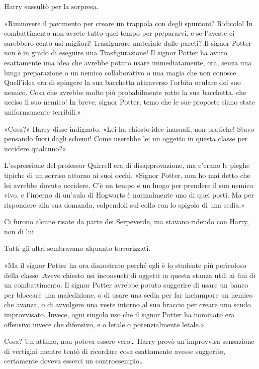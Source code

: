 Harry sussultò per la sorpresa.

«Rimuovere il pavimento per creare un trappola con degli spuntoni? Ridicolo! In combattimento non avrete tutto quel tempo per prepararvi, e se l’aveste ci sarebbero cento usi migliori! Trasfigurare materiale dalle pareti? Il signor Potter non è in grado di eseguire una Trasfigurazione! Il signor Potter ha avuto esattamente una idea che avrebbe potuto usare immediatamente, ora, senza una lunga preparazione o un nemico collaborativo o una magia che non conosce. Quell’idea era di spingere la sua bacchetta attraverso l’orbita oculare del suo nemico. Cosa che avrebbe molto più probabilmente rotto la sua bacchetta, che ucciso il suo nemico! In breve, signor Potter, temo che le sue proposte siano state uniformemente terribili.»

«Cosa?» Harry disse indignato. «Lei ha chiesto idee inusuali, non pratiche! Stavo pensando fuori dagli schemi! Come userebbe lei un oggetto in questa classe per uccidere qualcuno?»

L’espressione del professor Quirrell era di disapprovazione, ma c’erano le pieghe tipiche di un sorriso attorno ai suoi occhi. «Signor Potter, non ho mai detto che lei avrebbe dovuto uccidere. C’è un tempo e un luogo per prendere il suo nemico vivo, e l’interno di un’aula di Hogwarts è normalmente uno di quei posti. Ma per rispondere alla sua domanda, colpendoli sul collo con lo spigolo di una sedia.»

Ci furono alcune risate da parte dei Serpeverde, ma stavano ridendo con Harry, non di lui.

Tutti gli altri sembravano alquanto terrorizzati.

«Ma il signor Potter ha ora dimostrato perché egli è lo studente più pericoloso della classe. Avevo chiesto usi inconsueti di oggetti in questa stanza utili ai fini di un combattimento. Il signor Potter avrebbe potuto suggerire di usare un banco per bloccare una maledizione, o di usare una sedia per far inciampare un nemico che avanza, o di avvolgere una veste intorno al suo braccio per creare uno scudo improvvisato. Invece, ogni singolo uso che il signor Potter ha nominato era offensivo invece che difensivo, e o letale o potenzialmente letale.»

Cosa? Un attimo, non poteva essere vero… Harry provò un’improvvisa sensazione di vertigini mentre tentò di ricordare cosa esattamente avesse suggerito, certamente doveva esserci un controesempio…


